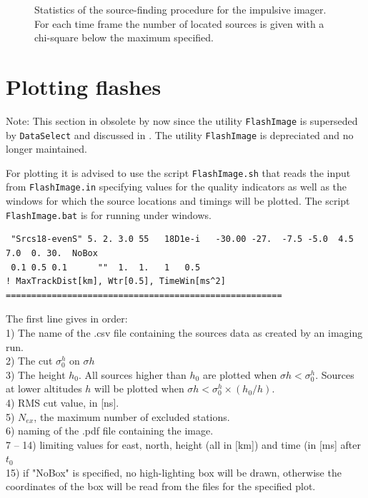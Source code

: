 \begin{figure}[th]
	\caption{Statistics of the source-finding procedure for the impulsive imager. For each time frame the number of located sources is given with a chi-square below the maximum specified.}	 
\end{figure}

\section{Plotting flashes}

Note: This section in obsolete by now since the utility \verb!FlashImage! is superseded by \verb!DataSelect! and discussed in .
The utility \verb!FlashImage! is depreciated and no longer maintained.

For plotting it is advised to use the script \verb!FlashImage.sh! that reads the input from \verb!FlashImage.in! specifying values for the quality indicators as well as the windows for which the source locations and timings will be plotted. The script \verb!FlashImage.bat! is for running under windows.

\begin{linenumbers}
\resetlinenumber
\small
\begin{verbatim}
 "Srcs18-evenS" 5. 2. 3.0 55   18D1e-i   -30.00 -27.  -7.5 -5.0  4.5 7.0  0. 30.  NoBox
 0.1 0.5 0.1      ""  1.  1.   1   0.5                                             ! MaxTrackDist[km], Wtr[0.5], TimeWin[ms^2]
======================================================
\end{verbatim}
\end{linenumbers}

The first line gives in order:
\\1) The name of the .csv file containing the sources data as created by an imaging run.
\\2) The cut $ \sigma_0^h $ on $\sigma{h}$
\\3) The height $h_0$. All sources higher than $h_0$ are plotted when  $\sigma{h} < \sigma_0^h$. Sources at lower altitudes $h$ will be plotted when $\sigma{h} < \sigma_0^h \times (h_0/h) $.
\\4) RMS cut value, in [ns].
\\5) $N_{ex}$, the maximum number of excluded stations.
\\6) naming of the .pdf file containing the image.
\\7 -- 14) limiting values for east, north, height (all in [km]) and time (in [ms] after $t_0$
\\15) if "NoBox" is specified, no high-lighting box will be drawn, otherwise the coordinates of the box will be read from the files for the specified plot.

